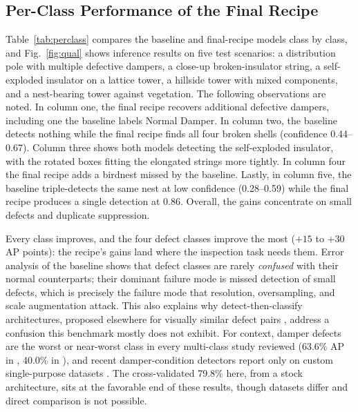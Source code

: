 \documentclass[conference]{IEEEtran}
\begin{document}
\subsection{Per-Class Performance of the Final Recipe}
Table~\ref{tab:perclass} compares the baseline and final-recipe models class by class, and Fig.~\ref{fig:qual} shows inference results on five test scenarios: a distribution pole with multiple defective dampers, a close-up broken-insulator string, a self-exploded insulator on a lattice tower, a hillside tower with mixed components, and a nest-bearing tower against vegetation. The following observations are noted. In column one, the final recipe recovers additional defective dampers, including one the baseline labels Normal Damper. In column two, the baseline detects nothing while the final recipe finds all four broken shells (confidence 0.44--0.67). Column three shows both models detecting the self-exploded insulator, with the rotated boxes fitting the elongated strings more tightly. In column four the final recipe adds a birdnest missed by the baseline. Lastly, in column five, the baseline triple-detects the same nest at low confidence (0.28--0.59) while the final recipe produces a single detection at 0.86. Overall, the gains concentrate on small defects and duplicate suppression.

Every class improves, and the four defect classes improve the most ($+15$ to $+30$ AP points): the recipe's gains land where the inspection task needs them. Error analysis of the baseline shows that defect classes are rarely \emph{confused} with their normal counterparts; their dominant failure mode is missed detection of small defects, which is precisely the failure mode that resolution, oversampling, and scale augmentation attack. This also explains why detect-then-classify architectures, proposed elsewhere for visually similar defect pairs \cite{zhang2023padetr,souza2023hybridyolo}, address a confusion this benchmark mostly does not exhibit. For context, damper defects are the worst or near-worst class in every multi-class study reviewed (63.6\% AP in \cite{zhang2024dsanet}, 40.0\% in \cite{su2024cessd}), and recent damper-condition detectors report only on custom single-purpose datasets \cite{zhou2026carenet}. The cross-validated 79.8\% here, from a stock architecture, sits at the favorable end of these results, though datasets differ and direct comparison is not possible.
\end{document}
